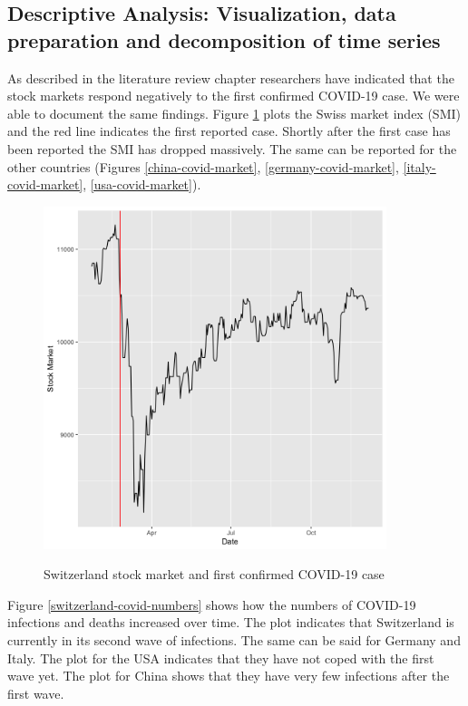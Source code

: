 \documentclass[11pt]{article}
\begin{document}
\subsection{Descriptive Analysis: Visualization, data preparation and decomposition of time series}
As described in the literature review chapter researchers have indicated that the stock markets respond negatively to the first confirmed COVID-19 case. We were able to document the same findings. Figure \ref{switzerland-covid-market} plots the Swiss market index (SMI) and the red line indicates the first reported case. Shortly after the first case has been reported the SMI has dropped massively. The same can be reported for the other countries (Figures \ref{china-covid-market}, \ref{germany-covid-market}, \ref{italy-covid-market}, \ref{usa-covid-market}).

\begin{figure}[!h]
\centering
\includegraphics[width=100mm]{R-Code/plots/switzerlandFinance.png} \\
\caption{Switzerland stock market and first confirmed COVID-19 case}
\label{switzerland-covid-market}
\end{figure}

Figure \ref{switzerland-covid-numbers} shows how the numbers of COVID-19 infections and deaths increased over time. The plot indicates that Switzerland is currently in its second wave of infections. The same can be said for Germany and Italy. The plot for the USA indicates that they have not coped with the first wave yet. The plot for China shows that they have very few infections after the first wave.
\end{document}
